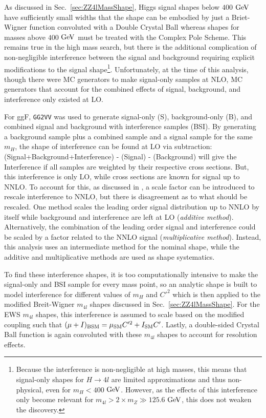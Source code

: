 As discussed in Sec.~\ref{sec:ZZ4lMassShape}, Higgs signal shapes below $400$ $\rm{GeV}$ have sufficiently small widths that the shape can be embodied by just a Briet-Wigner function convoluted with a Double Crystal Ball whereas shapes for masses above $400$ $\rm{GeV}$ must be treated with the Complex Pole Scheme. This remains true in the high mass search, but there is the additional complication of non-negligible interference between the signal and background \cite{} requiring explicit modifications to the signal shape\footnote{Because the interference is non-negligible at high masses, this means that signal-only shapes for $H\rightarrow 4l$ are limited approximations and thus non-physical, even for $m_{H}<400$ $\rm{GeV}$. However, as the effects of this interference only become relevant for $m_{4l} > 2\times m_{Z} \gg 125.6$ $\rm{GeV}$, this does not weaken the discovery.}. Unfortunately, at the time of this analysis, though there were MC generators to make signal-only samples at NLO, MC generators that account for the combined effects of signal, background, and interference only existed at LO.

For ggF, {\tt GG2VV} was used to generate signal-only (S), background-only (B), and combined signal and background with interference samples (BSI). By generating a background sample plus a combined sample and a signal sample for the same $m_H$, the shape of interference can be found at LO via subtraction: (Signal+Background+Interference) - (Signal) - (Background) will give the Interference if all samples are weighted by their respective cross sections. But, this interference is only LO, while cross sections are known for signal up to NNLO. To account for this, as discussed in \cite{}, a scale factor can be introduced to rescale interference to NNLO, but there is disagreement as to what should be rescaled. One method scales the leading order signal distribution up to NNLO by itself while background and interference are left at LO (\textit{additive method}). Alternatively, the combination of the leading order signal and interference could be scaled by a factor related to the NNLO signal (\textit{multiplicative method}). Instead, this analysis uses an intermediate method for the nominal shape, while the additive and multiplicative methods are used as shape systematics.

To find these interference shapes, it is too computationally intensive to make the signal-only and BSI sample for every mass point, so an analytic shape is built to model interference for different values of $m_{H}$ and $C'^2$ which is then applied to the modified Breit-Wigner $m_{4l}$ shapes discussed in Sec.~\ref{sec:ZZ4lMassShape}. For the EWS $m_{4l}$ shapes, this interference is assumed to scale based on the modified coupling such that $(\mu + I)_{\rm{BSM}} = \mu_{\rm{SM}}C'^2 + I_{\rm{SM}}C'$. Lastly, a double-sided Crystal Ball function is again convoluted with these $m_{4l}$ shapes to account for resolution effects. 

